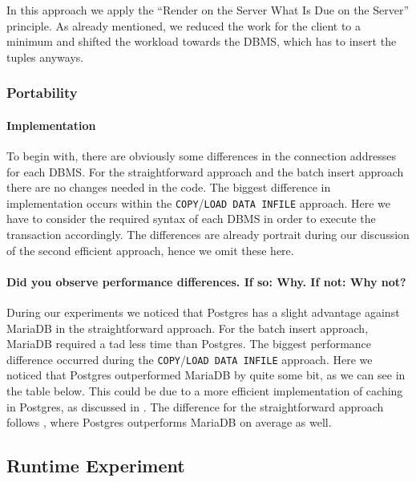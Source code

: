 \documentclass[11pt]{scrartcl}
\begin{document}
In this approach we apply the \enquote{Render on the Server What Is Due on the Server} principle.
As already mentioned, we reduced the work for the client to a minimum and shifted the workload towards the
DBMS, which has to insert the tuples anyways.

\subsubsection*{Portability}

\paragraph{Implementation}

To begin with, there are obviously some differences in the connection addresses for each DBMS.
For the straightforward approach and the batch insert approach there are no changes needed in the code.
The biggest difference in implementation occurs within the \texttt{COPY}/\texttt{LOAD DATA INFILE} approach.
Here we have to consider the required syntax of each DBMS in order to execute the transaction accordingly.
The differences are already portrait during our discussion of the second efficient approach, hence we omit these here.

\paragraph{Did you observe performance differences. If so: Why. If not: Why not?}
During our experiments we noticed that Postgres has a slight advantage against MariaDB in the straightforward approach.
For the batch insert approach, MariaDB required a tad less time than Postgres.
The biggest performance difference occurred during the \texttt{COPY}/\texttt{LOAD DATA INFILE} approach.
Here we noticed that Postgres outperformed MariaDB by quite some bit, as we can see in the table below.
This could be due to a more efficient implementation of caching in Postgres, as discussed in
\cite{KinstaMariaDBvsPostgreSQL2021}.
The difference for the straightforward approach follows \cite{Mitchell2024}, where
Postgres outperforms MariaDB on average as well.

\subsection*{Runtime Experiment}
\end{document}
